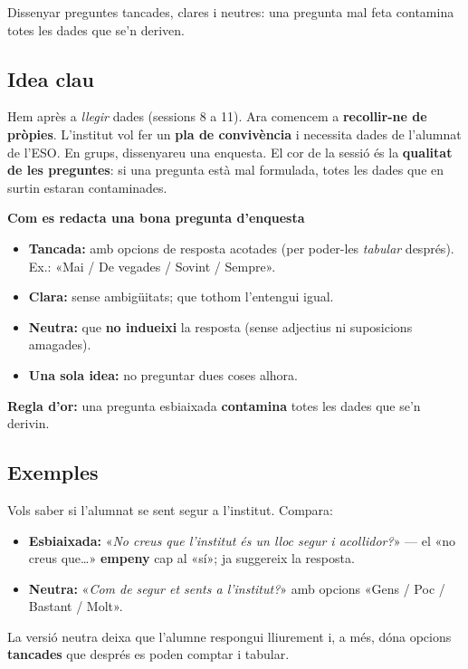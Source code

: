 %
{Dissenyar preguntes tancades, clares i neutres: una pregunta mal feta contamina totes les dades que se'n deriven.}

\subsection{Idea clau}

Hem après a \emph{llegir} dades (sessions 8 a 11). Ara comencem a \textbf{recollir-ne
de pròpies}. L'institut vol fer un \textbf{pla de convivència} i necessita dades de
l'alumnat de l'ESO. En grups, dissenyareu una enquesta. El cor de la sessió és la
\textbf{qualitat de les preguntes}: si una pregunta està mal formulada, totes les
dades que en surtin estaran contaminades.

\begin{idea}
\textbf{Com es redacta una bona pregunta d'enquesta}
\begin{itemize}[leftmargin=1.4em, itemsep=2pt]
  \item \textbf{Tancada:} amb opcions de resposta acotades (per poder-les
        \emph{tabular} després). Ex.: «Mai / De vegades / Sovint / Sempre».
  \item \textbf{Clara:} sense ambigüitats; que tothom l'entengui igual.
  \item \textbf{Neutra:} que \textbf{no indueixi} la resposta (sense adjectius ni
        suposicions amagades).
  \item \textbf{Una sola idea:} no preguntar dues coses alhora.
\end{itemize}
\textbf{Regla d'or:} una pregunta esbiaixada \textbf{contamina} totes les dades que
se'n derivin.
\end{idea}

\subsection{Exemples}

\begin{exemple}
Vols saber si l'alumnat se sent segur a l'institut. Compara:
\begin{itemize}[leftmargin=1.4em, itemsep=2pt]
  \item \textbf{Esbiaixada:} «\emph{No creus que l'institut és un lloc segur i
        acollidor?}» — el «no creus que\dots» \textbf{empeny} cap al «sí»; ja suggereix
        la resposta.
  \item \textbf{Neutra:} «\emph{Com de segur et sents a l'institut?}» amb opcions
        «Gens / Poc / Bastant / Molt».
\end{itemize}
La versió neutra deixa que l'alumne respongui lliurement i, a més, dóna opcions
\textbf{tancades} que després es poden comptar i tabular.
\end{exemple}


